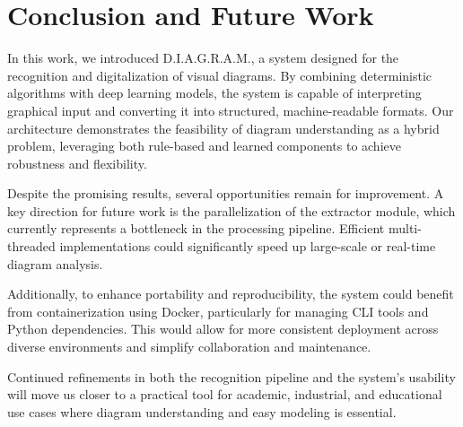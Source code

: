 \documentclass[conference]{IEEEtran}
\begin{document}
\section{Conclusion and Future Work}
In this work, we introduced D.I.A.G.R.A.M., a system designed for the recognition and digitalization of visual diagrams. By combining deterministic algorithms with deep learning models, the system is capable of interpreting graphical input and converting it into structured, machine-readable formats. Our architecture demonstrates the feasibility of diagram understanding as a hybrid problem, leveraging both rule-based and learned components to achieve robustness and flexibility.

Despite the promising results, several opportunities remain for improvement. A key direction for future work is the parallelization of the extractor module, which currently represents a bottleneck in the processing pipeline. Efficient multi-threaded implementations could significantly speed up large-scale or real-time diagram analysis.

Additionally, to enhance portability and reproducibility, the system could benefit from containerization using Docker, particularly for managing CLI tools and Python dependencies. This would allow for more consistent deployment across diverse environments and simplify collaboration and maintenance.

Continued refinements in both the recognition pipeline and the system's usability will move us closer to a practical tool for academic, industrial, and educational use cases where diagram understanding and easy modeling is essential.

\newpage


\newpage
\end{document}
